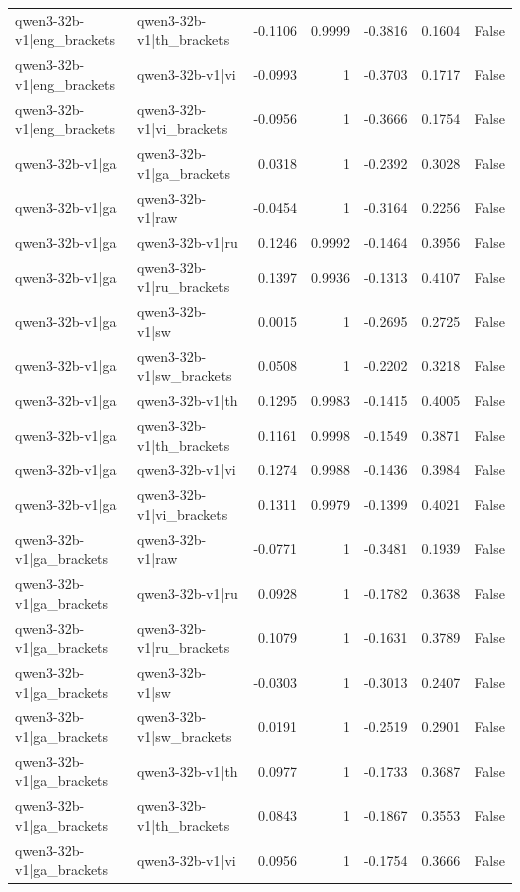 \begin{table}
\begin{tabular}{l l r r r r l}
qwen3-32b-v1|eng_brackets & qwen3-32b-v1|th_brackets & -0.1106 & 0.9999 & -0.3816 & 0.1604 & False \\
qwen3-32b-v1|eng_brackets & qwen3-32b-v1|vi & -0.0993 & 1 & -0.3703 & 0.1717 & False \\
qwen3-32b-v1|eng_brackets & qwen3-32b-v1|vi_brackets & -0.0956 & 1 & -0.3666 & 0.1754 & False \\
qwen3-32b-v1|ga & qwen3-32b-v1|ga_brackets & 0.0318 & 1 & -0.2392 & 0.3028 & False \\
qwen3-32b-v1|ga & qwen3-32b-v1|raw & -0.0454 & 1 & -0.3164 & 0.2256 & False \\
qwen3-32b-v1|ga & qwen3-32b-v1|ru & 0.1246 & 0.9992 & -0.1464 & 0.3956 & False \\
qwen3-32b-v1|ga & qwen3-32b-v1|ru_brackets & 0.1397 & 0.9936 & -0.1313 & 0.4107 & False \\
qwen3-32b-v1|ga & qwen3-32b-v1|sw & 0.0015 & 1 & -0.2695 & 0.2725 & False \\
qwen3-32b-v1|ga & qwen3-32b-v1|sw_brackets & 0.0508 & 1 & -0.2202 & 0.3218 & False \\
qwen3-32b-v1|ga & qwen3-32b-v1|th & 0.1295 & 0.9983 & -0.1415 & 0.4005 & False \\
qwen3-32b-v1|ga & qwen3-32b-v1|th_brackets & 0.1161 & 0.9998 & -0.1549 & 0.3871 & False \\
qwen3-32b-v1|ga & qwen3-32b-v1|vi & 0.1274 & 0.9988 & -0.1436 & 0.3984 & False \\
qwen3-32b-v1|ga & qwen3-32b-v1|vi_brackets & 0.1311 & 0.9979 & -0.1399 & 0.4021 & False \\
qwen3-32b-v1|ga_brackets & qwen3-32b-v1|raw & -0.0771 & 1 & -0.3481 & 0.1939 & False \\
qwen3-32b-v1|ga_brackets & qwen3-32b-v1|ru & 0.0928 & 1 & -0.1782 & 0.3638 & False \\
qwen3-32b-v1|ga_brackets & qwen3-32b-v1|ru_brackets & 0.1079 & 1 & -0.1631 & 0.3789 & False \\
qwen3-32b-v1|ga_brackets & qwen3-32b-v1|sw & -0.0303 & 1 & -0.3013 & 0.2407 & False \\
qwen3-32b-v1|ga_brackets & qwen3-32b-v1|sw_brackets & 0.0191 & 1 & -0.2519 & 0.2901 & False \\
qwen3-32b-v1|ga_brackets & qwen3-32b-v1|th & 0.0977 & 1 & -0.1733 & 0.3687 & False \\
qwen3-32b-v1|ga_brackets & qwen3-32b-v1|th_brackets & 0.0843 & 1 & -0.1867 & 0.3553 & False \\
qwen3-32b-v1|ga_brackets & qwen3-32b-v1|vi & 0.0956 & 1 & -0.1754 & 0.3666 & False \\

\end{tabular}
\end{table}
